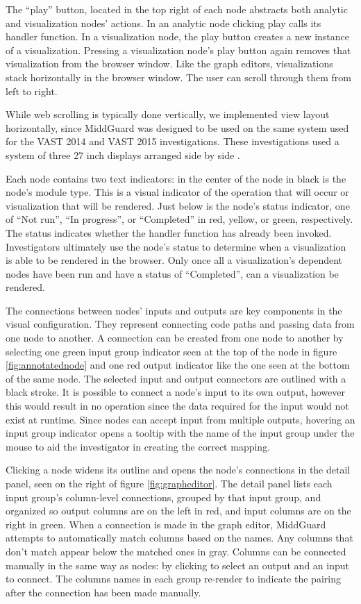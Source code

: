 \documentclass[midd]{thesis}
\begin{document}
The ``play'' button, located in the top right of each node abstracts both
analytic and visualization nodes' actions. In an analytic node clicking play
calls its handler function. In a visualization node, the play button creates a
new instance of a visualization. Pressing a visualization node's play button
again removes that visualization from the browser window. Like the graph
editors, visualizations stack horizontally in the browser window. The user can
scroll through them from left to right.

While web scrolling is typically done vertically, we implemented view layout
horizontally, since MiddGuard was designed to be used on the same system used
for the VAST 2014 and VAST 2015 investigations. These investigations
used a system of three 27 inch displays arranged side by side
\cite{middguard-dinofunworld}.

Each node contains two text indicators: in the center of the node in black is
the node's module type. This is a visual indicator of the operation that will
occur or visualization that will be rendered. Just below is the node's status
indicator, one of ``Not run'', ``In progress'', or ``Completed'' in red, yellow,
or green, respectively. The status indicates whether the handler function has
already been invoked. Investigators ultimately use the node's status to
determine when a visualization is able to be rendered in the browser. Only once
all a visualization's dependent nodes have been run and have a status of
``Completed'', can a visualization be rendered.

The connections between nodes' inputs and outputs are key components in the
visual configuration. They represent connecting code paths and passing
data from one node to another. A connection can be created from one node to
another by selecting one green input group indicator seen at the top of the node
in figure \ref{fig:annotatednode} and one red output indicator like the one seen
at the bottom of the same node. The selected input and output connectors are
outlined with a black stroke. It is possible to connect a node's input to its
own output, however this would result in no operation since the data required
for the input would not exist at runtime. Since nodes can accept input from
multiple outputs, hovering an input group indicator opens a tooltip with the
name of the input group under the mouse to aid the investigator in creating the
correct mapping.

Clicking a node widens its outline and opens the node's connections in the
detail panel, seen on the right of figure \ref{fig:grapheditor}. The detail
panel lists each input group's column-level connections, grouped by that input
group, and organized so output columns are on the left in red, and input columns
are on the right in green. When a connection is made in the graph editor,
MiddGuard attempts to automatically match columns based on the names. Any
columns that don't match appear below the matched ones in gray. Columns can be
connected manually in the same way as nodes: by clicking to select an output and
an input to connect. The columns names in each group re-render to indicate the
pairing after the connection has been made manually.
\end{document}
